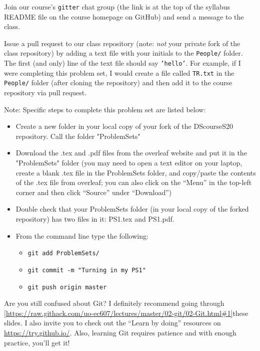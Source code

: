 \documentclass[12pt,english]{exam}
\begin{document}
\begin{questions}
\question Join our course's \texttt{gitter} chat group (the link is at the top of the syllabus README file on the course homepage on GitHub) and send a message to the class.

\question Issue a pull request to our class repository (note: \emph{not} your private fork of the class repository) by adding a text file with your initials to the \texttt{People/} folder. The first (and only) line of the text file should say \texttt{'hello'}. For example, if I were completing this problem set, I would create a file called \texttt{TR.txt} in the \texttt{People/} folder (after cloning the repository) and then add it to the course repository via pull request.

\end{questions}

Note: Specific steps to complete this problem set are listed below:
\begin{itemize}
\item Create a new folder in your local copy of your fork of the DScourseS20 repository. Call the folder "ProblemSets"
\item Download the .tex and .pdf files from the overleaf website and put it in the "ProblemSets" folder (you may need to open a text editor on your laptop, create a blank .tex file in the ProblemSets folder, and copy/paste the contents of the .tex file from overleaf; you can also click on the ``Menu'' in the top-left corner and then click ``Source'' under ``Download'')
\item Double check that your ProblemSets folder (in your local copy of the forked repository) has two files in it: PS1.tex and PS1.pdf.
\item From the command line type the following:
    \begin{itemize}
    \item \texttt{git add ProblemSets/}
    \item \texttt{git commit -m "Turning in my PS1"}
    \item \texttt{git push origin master}
    \end{itemize}
\end{itemize}

Are you still confused about Git? I definitely recommend going through \ref{https://raw.githack.com/uo-ec607/lectures/master/02-git/02-Git.html#1}{these slides}. I also invite you to check out the ``Learn by doing'' resources on \url{https://try.github.io/}. Also, learning Git requires patience and with enough practice, you'll get it!
\end{document}
